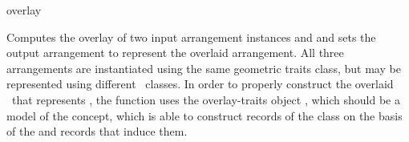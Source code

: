 
\ccRefPageBegin

\begin{ccRefFunction}{overlay}


   {Computes the overlay of two input arrangement instances  and
     and sets the output arrangement  to represent the
    overlaid arrangement. All three arrangements are instantiated using the
    same geometric traits class, but may be represented using different
    \dcel\ classes. In order to properly construct the overlaid \dcel\ that
    represents , the function uses the overlay-traits object
    , which should be a model of the  concept,
    which is able to construct records of the  class on the
    basis of the  and  records that induce them.}

\ccSeeAlso

\end{ccRefFunction}

\ccRefPageEnd
